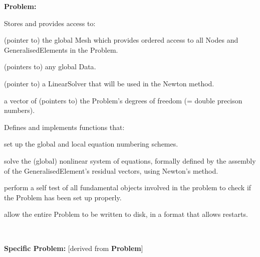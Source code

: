 \begin{center} \begin{TabularC}{1}
\hline
\begin{center} \begin{TabularC}{1}
\hline
\begin{center} {\bfseries Problem\-:} \end{center} 
\begin{DoxyItemize}
\item Stores and provides access to\-:
\begin{DoxyItemize}
\item (pointer to) the global {\ttfamily Mesh} which provides ordered access to all {\ttfamily Nodes} and {\ttfamily Generalised\-Elements} in the {\ttfamily Problem}.
\item (pointers to) any global {\ttfamily Data}.
\item (pointer to) a {\ttfamily Linear\-Solver} that will be used in the Newton method.
\item a vector of (pointers to) the {\ttfamily Problem's} degrees of freedom (= double precison numbers).
\end{DoxyItemize}
\item Defines and implements functions that\-:
\begin{DoxyItemize}
\item set up the global and local equation numbering schemes.
\item solve the (global) nonlinear system of equations, formally defined by the assembly of the {\ttfamily Generalised\-Element's} residual vectors, using Newton's method.
\item perform a self test of all fundamental objects involved in the problem to check if the {\ttfamily Problem} has been set up properly.
\item allow the entire Problem to be written to disk, in a format that allows restarts.   
\end{DoxyItemize}
\end{DoxyItemize}\\
\end{TabularC}
\end{center}  \begin{center} \begin{TabularC}{1}
\hline
\begin{center} {\bfseries Specific Problem\-:} \newline
\mbox{[}derived from {\bfseries Problem}\mbox{]} \end{center} 

\end{TabularC}
\end{center}
\end{TabularC}
\end{center}
